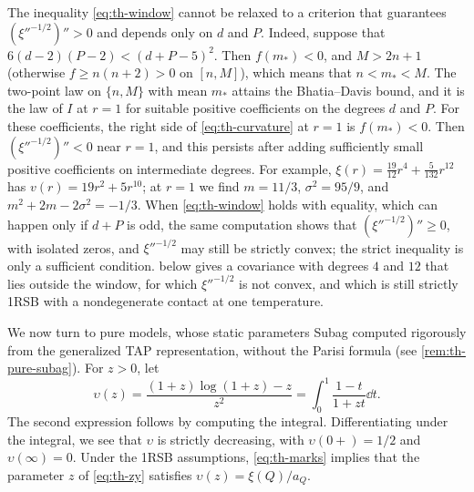 \begin{remark}\label{rem:th-window}
The inequality \eqref{eq:th-window} cannot be relaxed to a criterion that guarantees $(\xi''^{-1/2})''>0$ and depends only on $d$ and $P$. Indeed, suppose that $6(d-2)(P-2)<(d+P-5)^2$. Then $f(m_*)<0$, and $M>2n+1$ (otherwise $f\ge n(n+2)>0$ on $[n,M]$), which means that $n<m_*<M$. The two-point law on $\{n,M\}$ with mean $m_*$ attains the Bhatia--Davis bound, and it is the law of $I$ at $r=1$ for suitable positive coefficients on the degrees $d$ and $P$. For these coefficients, the right side of \eqref{eq:th-curvature} at $r=1$ is $f(m_*)<0$. Then $(\xi''^{-1/2})''<0$ near $r=1$, and this persists after adding sufficiently small positive coefficients on intermediate degrees. For example, $\xi(r)=\frac{19}{12}r^4+\frac5{132}r^{12}$ has $v(r)=19r^2+5r^{10}$; at $r=1$ we find $m=11/3$, $\sigma^2=95/9$, and $m^2+2m-2\sigma^2=-1/3$. When \eqref{eq:th-window} holds with equality, which can happen only if $d+P$ is odd, the same computation shows that $(\xi''^{-1/2})''\ge0$, with isolated zeros, and $\xi''^{-1/2}$ may still be strictly convex; the strict inequality is only a sufficient condition.  below gives a covariance with degrees $4$ and $12$ that lies outside the window, for which $\xi''^{-1/2}$ is not convex, and which is still strictly 1RSB with a nondegenerate contact at one temperature.
\end{remark}

We now turn to pure models, whose static parameters Subag computed rigorously from the generalized TAP representation, without the Parisi formula (see \cref{rem:th-pure-subag}). For $z>0$, let
\begin{equation}\label{eq:th-upsilon}
\upsilon(z)=\frac{(1+z)\log(1+z)-z}{z^2}=\int_0^1\frac{1-t}{1+zt}\dd t.
\end{equation}
The second expression follows by computing the integral. Differentiating under the integral, we see that $\upsilon$ is strictly decreasing, with $\upsilon(0+)=1/2$ and $\upsilon(\infty)=0$. Under the 1RSB assumptions, \eqref{eq:th-marks} implies that the parameter $z$ of \eqref{eq:th-zy} satisfies $\upsilon(z)=\xi(Q)/a_Q$.

